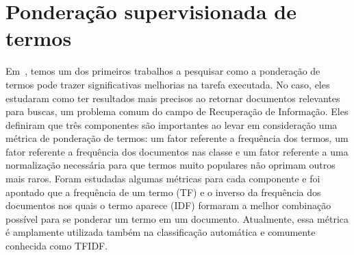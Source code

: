 \section{Ponderação supervisionada de termos}
\label{sec::supervised}
Em~\cite{Salton88}, temos um dos primeiros trabalhos a pesquisar como a ponderação de termos pode trazer significativas melhorias na tarefa executada. 
No caso, eles estudaram como ter resultados mais precisos ao retornar documentos relevantes para buscas, um problema comum do campo de Recuperação de Informação. 
Eles definiram que três componentes são importantes ao levar em consideração uma métrica de ponderação de termos: um fator referente a frequência dos termos, um fator referente a frequência dos documentos nas classe e um fator referente a uma normalização necessária para que termos muito populares não oprimam outros mais raros.
Foram estudadas algumas métricas para cada componente e foi apontado que a frequência de um termo (\textsc{TF}) e o inverso da frequência dos documentos nos quais o termo aparece (\textsc{IDF}) formaram a melhor combinação possível para se ponderar um termo em um documento. 
Atualmente, essa métrica é amplamente utilizada também na classificação automática e comumente conhecida como \textsc{TFIDF}.

